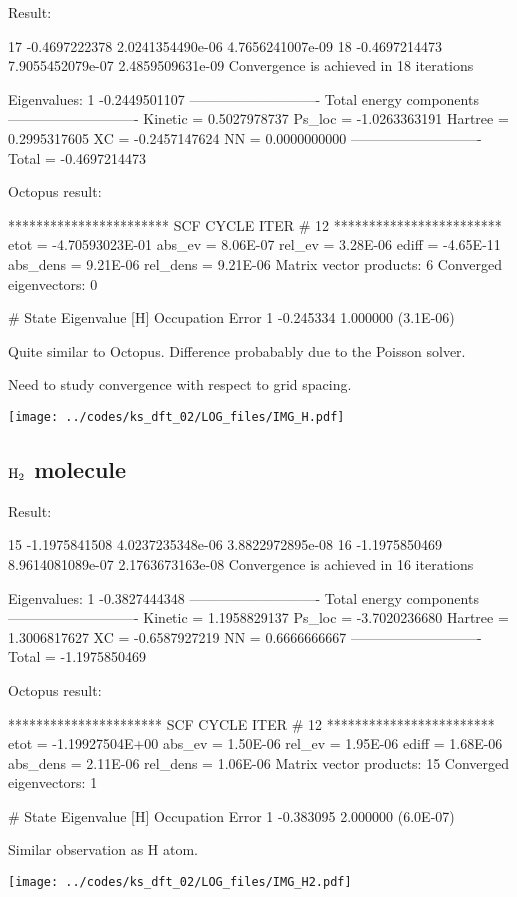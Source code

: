 Result:
\begin{textcode}
  17      -0.4697222378   2.0241354490e-06   4.7656241007e-09
  18      -0.4697214473   7.9055452079e-07   2.4859509631e-09
Convergence is achieved in 18 iterations

Eigenvalues:
 1      -0.2449501107
----------------------------
Total energy components
----------------------------
Kinetic =       0.5027978737
Ps_loc  =      -1.0263363191
Hartree =       0.2995317605
XC      =      -0.2457147624
NN      =       0.0000000000
----------------------------
Total   =      -0.4697214473
\end{textcode}

Octopus result:
\begin{textcode}
*********************** SCF CYCLE ITER #   12 ************************
 etot  = -4.70593023E-01 abs_ev   =  8.06E-07 rel_ev   =  3.28E-06
 ediff =       -4.65E-11 abs_dens =  9.21E-06 rel_dens =  9.21E-06
Matrix vector products:      6
Converged eigenvectors:      0
 
 #  State  Eigenvalue [H]  Occupation    Error
       1       -0.245334    1.000000   (3.1E-06)
\end{textcode}

Quite similar to Octopus.
Difference probabably due to the Poisson solver.

Need to study convergence with respect to grid spacing.

{\centering
\texttt{[image: ../codes/ks\_dft\_02/LOG\_files/IMG\_H.pdf]}
}

\subsection{$\ce{H2}$ molecule}

Result:
\begin{textcode}
  15      -1.1975841508   4.0237235348e-06   3.8822972895e-08
  16      -1.1975850469   8.9614081089e-07   2.1763673163e-08
Convergence is achieved in 16 iterations

Eigenvalues:
 1      -0.3827444348
----------------------------
Total energy components
----------------------------
Kinetic =       1.1958829137
Ps_loc  =      -3.7020236680
Hartree =       1.3006817627
XC      =      -0.6587927219
NN      =       0.6666666667
----------------------------
Total   =      -1.1975850469
\end{textcode}

Octopus result:
\begin{textcode}
********************** SCF CYCLE ITER #   12 ************************
 etot  = -1.19927504E+00 abs_ev   =  1.50E-06 rel_ev   =  1.95E-06
 ediff =        1.68E-06 abs_dens =  2.11E-06 rel_dens =  1.06E-06
Matrix vector products:     15
Converged eigenvectors:      1

#  State  Eigenvalue [H]  Occupation    Error
      1       -0.383095    2.000000   (6.0E-07) 
\end{textcode}

Similar observation as H atom.

{\centering
\texttt{[image: ../codes/ks\_dft\_02/LOG\_files/IMG\_H2.pdf]}
}